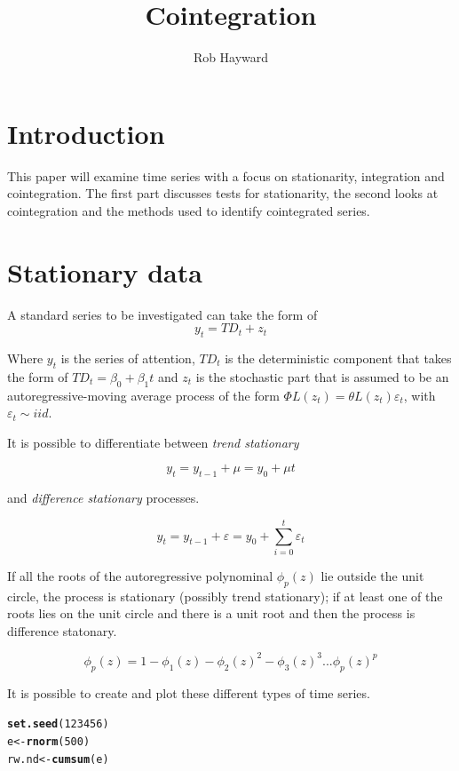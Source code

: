 \documentclass{article}\usepackage{graphicx, color}
\title{Cointegration}
\author{Rob Hayward}
\makeatletter
\newcommand{\hlfunctioncall}[1]{\textcolor[rgb]{0.501960784313725,0,0.329411764705882}{\textbf{#1}}}%
\newenvironment{kframe}{%
 \def\at@end@of@kframe{}%
 \ifinner\ifhmode%
  \def\at@end@of@kframe{\end{minipage}}%
  \begin{minipage}{\columnwidth}%
 \fi\fi%
 \def\FrameCommand##1{\hskip\@totalleftmargin \hskip-\fboxsep
 \colorbox{shadecolor}{##1}\hskip-\fboxsep
     \hskip-\linewidth \hskip-\@totalleftmargin \hskip\columnwidth}%
 \MakeFramed {\advance\hsize-\width
   \@totalleftmargin\z@ \linewidth\hsize
   \@setminipage}}%
 {\par\unskip\endMakeFramed%
 \at@end@of@kframe}
\newenvironment{knitrout}{}{} %
\makeatother
\begin{document}
\maketitle
\section{Introduction}
This paper will examine time series with a focus on stationarity, integration and cointegration. The first part discusses tests for stationarity, the second looks at cointegration and the methods used to identify cointegrated series. 

\section{Stationary data}
A standard series to be investigated can take the form of 
\begin{equation}
y_t = TD_t + z_t
\end{equation}

Where $y_t$ is the series of attention, $TD_t$ is the deterministic component that takes the form of $TD_t = \beta_0 + \beta_1 t$ and $z_t$ is the stochastic part that is assumed to be an autoregressive-moving average process of the form $\Phi L(z_t) = \theta L(z_t) \varepsilon_t$,  with $\varepsilon_t \sim iid$. 

It is possible to differentiate between \emph{trend stationary} 

\begin{equation}
y_t = y_{t-1} + \mu = y_0 + \mu t
\end{equation}

and \emph{difference stationary} processes.  

\begin{equation}
y_t = y_{t-1} + \varepsilon = y_0 + \sum_{i=0}^t \varepsilon_t
\end{equation}

If all the roots of the autoregressive polynominal $\phi_p(z)$ lie outside the unit circle, the process is stationary (possibly trend stationary); if at least one of the roots lies on the unit circle and there is a unit root and then the process is difference statonary. 

\begin{equation}
\phi_p(z) = 1 - \phi_1 (z) - \phi_2(z)^2 - \phi_3(z)^3...\phi_p(z)^p
\end{equation}
 
It is possible to create and plot these different types of time series.  
\begin{knitrout}
\color{fgcolor}\begin{kframe}
\begin{alltt}
\hlfunctioncall{set.seed}(123456)
e <- \hlfunctioncall{rnorm}(500)
rw.nd <- \hlfunctioncall{cumsum}(e)
\end{alltt}
\end{kframe}
\end{knitrout}
\end{document}
